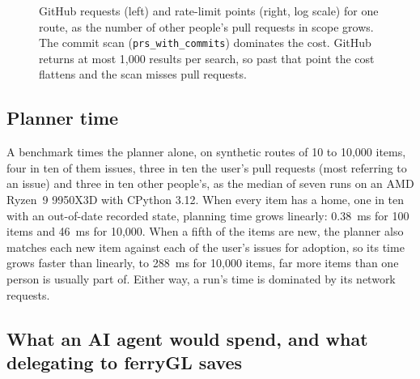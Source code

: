 \documentclass[11pt,a4paper]{article}
\newcommand{\ferry}{ferryGL}
\newcommand{\code}[1]{\texttt{#1}}
\begin{document}
\begin{figure}[t]
  \centering
  
  \caption{GitHub requests (left) and rate-limit points (right, log scale) for one route, as the
    number of other people's pull requests in scope grows. The commit scan
    (\code{prs\_with\_commits}) dominates the cost. GitHub returns at most 1,000 results per
    search, so past that point the cost flattens and the scan misses pull requests.}
  \label{fig:cost}
\end{figure}

\subsection{Planner time}
\label{sec:eval-planner}

A benchmark times the planner alone, on synthetic routes of 10 to 10,000 items, four in ten of
them issues, three in ten the user's pull requests (most referring to an issue) and three in
ten other people's, as the median of seven runs on an AMD Ryzen~9 9950X3D with CPython 3.12.
When every item has a home, one in ten with an out-of-date recorded state, planning time grows
linearly: 0.38~ms for 100 items and 46~ms for 10,000. When a fifth of the items are new, the
planner also matches each new item against each of the user's issues for adoption, so its time
grows faster than linearly, to 288~ms for 10,000 items, far more items than one person is
usually part of. Either way, a run's time is dominated by its network requests.

\subsection{What an AI agent would spend, and what delegating to \ferry{} saves}
\label{sec:eval-agent}
\end{document}
